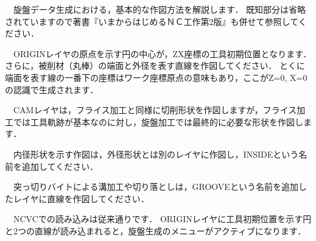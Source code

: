 

\vspace*{1zh}
　旋盤データ生成における，基本的な作図方法を解説します．
既知部分は省略されていますので著書『いまからはじめるＮＣ工作第2版』も併せて参照してください．


　ORIGINレイヤの原点を示す円の中心が，ZX座標の工具初期位置となります．
さらに，被削材（丸棒）の端面と外径を表す直線を作図してください．
とくに端面を表す線の一番下の座標はワーク座標原点の意味もあり，ここがZ=0, X=0の認識で生成されます．

　CAMレイヤは，フライス加工と同様に切削形状を作図しますが，フライス加工では工具軌跡が基本なのに対し，旋盤加工では最終的に必要な形状を作図します．

　内径形状を示す作図は，外径形状とは別のレイヤに作図し，INSIDEという名前を追加してください．

　突っ切りバイトによる溝加工や切り落としは，GROOVEという名前を追加したレイヤに直線を作図してください．

　NCVCでの読み込みは従来通りです．
ORIGINレイヤに工具初期位置を示す円と2つの直線が読み込まれると，旋盤生成のメニューがアクティブになります．

